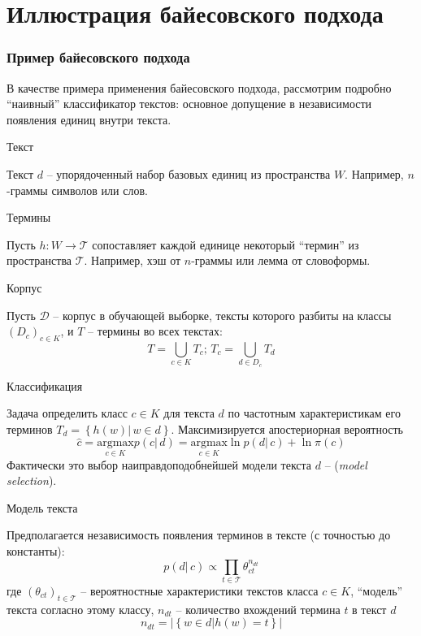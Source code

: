 \documentclass{beamer}
\newcommand{\eng}[1]{\foreignlanguage{english}{#1}}
\newcommand{\obj}[1]{\left\{ #1 \right \}}
\newcommand{\brac}[1]{\left ( #1 \right )}
\newcommand{\induc}[1]{\left . #1 \right \vert}
\newcommand{\abs}[1]{\left | #1 \right |}
\newcommand{\Dcal}{\mathcal{D}}
\newcommand{\Tcal}{\mathcal{T}}
\begin{document}
\section{Иллюстрация байесовского подхода} %
\label{sec:bayes_demonstration}
\begin{frame}\frametitle{Пример байесовского подхода}
  \begin{block}

    В качестве примера применения байесовского подхода, рассмотрим подробно ``наивный'' классификатор текстов: основное допущение в независимости появления единиц внутри текста.
  \end{block}
  \begin{block}{Текст}

    Текст $d$ -- упорядоченный набор базовых единиц из пространства $W$.
    Например, $n$-граммы символов или слов.
  \end{block}
  \begin{block}{Термины}

    Пусть $h:W\to \Tcal$ сопоставляет каждой единице некоторый ``термин'' из пространства $\Tcal$. Например, хэш от $n$-граммы или лемма от словоформы.
  \end{block}
\end{frame}

\begin{frame}
  \begin{block}{Корпус}

    Пусть $\Dcal$ -- корпус в обучающей выборке, тексты которого разбиты на классы $\brac{D_c}_{c\in K}$, и $T$ -- термины во всех текстах:
    \[T = \bigcup_{c\in K}T_c;\,T_c = \bigcup_{d\in D_c} T_d\]
  \end{block}

  \begin{block}{Классификация}

    Задача определить класс $c\in K$ для текста $d$ по частотным характеристикам его терминов $T_d = \obj{\induc{h(w)}\,w\in d}$.
    Максимизируется апостериорная вероятность 
   \[\hat{c} = \underset{c\in K}{\text{argmax}} p\brac{\induc{c}\,d} = \underset{c\in K}{\text{argmax}} \ln p\brac{\induc{d}\,c} + \ln \pi\brac{c} \]
    Фактически это выбор наиправдоподобнейшей модели текста $d$ -- (\eng{\emph{model selection}}).
  \end{block}
\end{frame}

\begin{frame}
  \begin{block}{Модель текста}

    Предполагается независимость появления терминов в тексте (с точностью до константы):
    \[p\brac{\induc{d}\,c} \propto \prod_{t\in \Tcal}\theta_{ct}^{n_{dt}}\]
    где $\brac{\theta_{ct}}_{t\in \Tcal}$ -- вероятностные характеристики текстов класса $c\in K$, ``модель'' текста согласно этому классу, $n_{dt}$ -- количество вхождений термина $t$ в текст $d$
    \[n_{dt} = \abs{\obj{\induc{w\in d} h(w) = t}}\]
  \end{block}

\end{frame}
\end{document}
